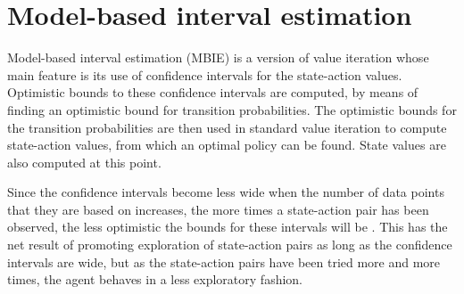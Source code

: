 \section{Model-based interval estimation}
\label{sec:mbie}

Model-based interval estimation (MBIE) is a version of value iteration whose main
feature is its use of confidence intervals for the state-action values.
Optimistic bounds to these confidence intervals are computed, by means of
finding an optimistic bound for transition probabilities. The optimistic bounds
for the transition probabilities are then used in standard value iteration to
compute state-action values, from which an optimal policy can be found. State
values are also computed at this point.

Since the confidence intervals become less wide when the number of data
points that they are based on increases, the more times a state-action pair
has been observed, the less optimistic the bounds for these intervals will be
\parencite{dietterich2013pac}. This has the net result of promoting
exploration of state-action pairs as long as the confidence intervals are
wide, but as the state-action pairs have been tried more and more times, the
agent behaves in a less exploratory fashion. 


\begin{comment}
Model-based interval estimation is a modification of value iteration whose main feature is its  addition of confidence
intervals to the state-action values. These confidence intervals allow the agent to choose between
actions, based on how confident it is about its evaluation of them. In effect,
the less certain the agent is about its evaluation of the states and actions,
the more exploratory the actions will be. When the agent is more confident
however, it will exploit what it has learned so far about the MDP
\parencite{dietterich2013pac}.
\end{comment}






